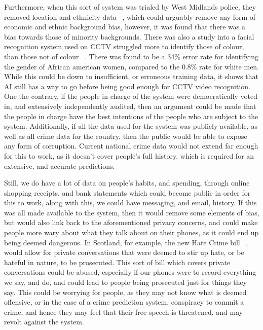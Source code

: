 Furthermore, when this sort of system was trialed by West Midlands police, they removed location and ethnicity data
~\cite{wmp-trial}, which could arguably remove any form of economic and ethnic background bias, however, it was
found that there was a bias towards those of minority backgrounds.
There was also a study into a facial recognition system used on CCTV struggled more to identify those of colour,
than those not of colour ~\cite{ifsec-bias-article}.
There was found to be a 34\% error rate for identifying the gender of African american women, compared to the
0.8\% rate for white men.
While this could be down to insufficient, or erroneous training data, it shows that AI still has a way to go before
being good enough for CCTV video recognition.
\\

One the contrary, if the people in charge of the system were democratically voted in, and extensively independently
audited, then an argument could be made that the people in charge have the best intentions of the people who are
subject to the system.
Additionally, if all the data used for the system was publicly available, as well as all crime data for the
country, then the public would be able to expose any form of corruption.
Current national crime data would not extend far enough for this to work, as it doesn't cover people's full history,
which is required for an extensive, and accurate predictions.

Still, we do have a lot of data on people's habits, and spending, through online shopping receipts, and bank statements
which could become public in order for this to work, along with this, we could have messaging, and email, history.
If this was all made available to the system, then it would remove some elements of bias, but would also link back to
the aforementioned privacy concerns, and could make people more wary about what they talk about on their phones, as
it could end up being deemed dangerous.
In Scotland, for example, the new Hate Crime bill  ~\cite{hate-crime-bill}, would allow for private conversations that
were deemed to stir up hate, or be hateful in nature, to be prosecuted.
This sort of bill which covers private conversations could be abused, especially if our phones were to record
everything we say, and do, and could lead to people being prosecuted just for things they say.
This could be worrying for people, as they may not know what is deemed offensive, or in the case of a crime prediction
system, conspiracy to commit a crime, and hence they may feel that their free speech is threatened, and may revolt
against the system.
\\

